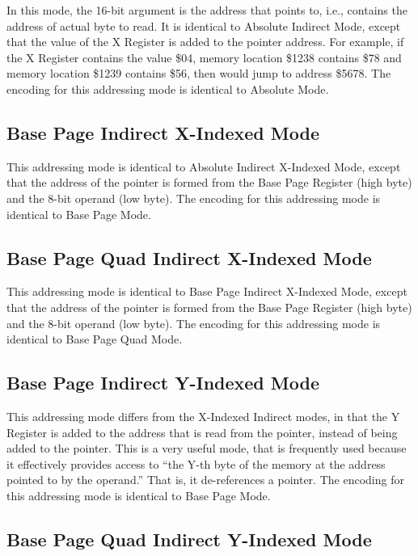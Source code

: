 In this mode, the 16-bit argument is the address that points to, i.e., contains the
address of actual byte to read. It is identical to Absolute Indirect Mode, except that
 the value of the X Register is added to the pointer address.
For example, if the X Register contains the value \$04, memory location \$1238 contains \$78
and memory location \$1239 contains \$56, then  would jump
to address \$5678.
The encoding for this addressing mode is identical to Absolute Mode.

\subsection{Base Page Indirect X-Indexed Mode}

This addressing mode is identical to Absolute Indirect X-Indexed Mode, except that the address
of the pointer is formed from the Base Page Register (high byte) and the 8-bit operand (low byte).
The encoding for this addressing mode is identical to Base Page Mode.

\subsection{Base Page Quad Indirect X-Indexed Mode}

This addressing mode is identical to Base Page Indirect X-Indexed Mode, except that the address
of the pointer is formed from the Base Page Register (high byte) and the 8-bit operand (low byte).
The encoding for this addressing mode is identical to Base Page Quad Mode.

\subsection{Base Page Indirect Y-Indexed Mode}

This addressing mode differs from the X-Indexed Indirect modes, in that the Y Register is
added to the address that is read from the pointer, instead of being added to the pointer.
This is a very useful mode, that is frequently used because it effectively provides access to
``the Y-th byte of the memory at the address pointed to by the operand.'' That is, it de-references
a pointer.
The encoding for this addressing mode is identical to Base Page Mode.

\subsection{Base Page Quad Indirect Y-Indexed Mode}

